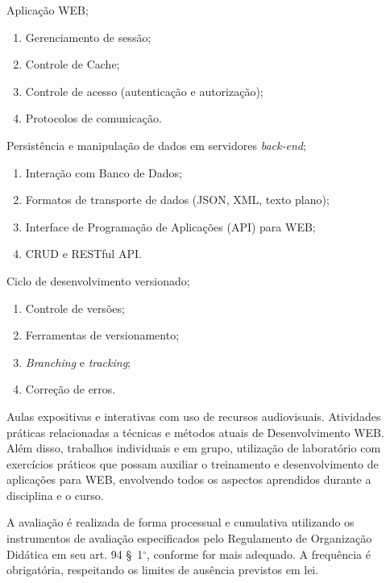 \begin{pud}
\begin{description}[itemsep=0em]
        \item[UNIDADE II:] Aplicação WEB;
	         \begin{enumerate}[itemsep=0em, topsep=0em]
				\item Gerenciamento de sessão;
				\item Controle de Cache;
				\item Controle de acesso (autenticação e autorização);
				\item Protocolos de comunicação.
            \end{enumerate}
            
         \item[UNIDADE III:] Persistência e manipulação de dados em servidores \textit{back-end};
	         \begin{enumerate}[itemsep=0em, topsep=0em]
				\item Interação com Banco de Dados;
				\item Formatos de transporte de dados (JSON, XML, texto plano);
				\item Interface de Programação de Aplicações (API) para WEB;
				\item CRUD e RESTful API.        
            \end{enumerate}
            
         \item[UNIDADE IV:]  Ciclo de desenvolvimento versionado;
	         \begin{enumerate}[itemsep=0em, topsep=0em]
				\item Controle de versões;
                \item Ferramentas de versionamento;
                \item \textit{Branching} e \textit{tracking};
                \item Correção de erros.
            \end{enumerate}

	\end{description}
	
	
	\metodologia
	Aulas expositivas e interativas com uso de recursos audiovisuais. Atividades práticas relacionadas a técnicas e métodos atuais de Desenvolvimento WEB. Além disso, trabalhos individuais e em grupo, utilização de laboratório com exercícios práticos que possam auxiliar o treinamento e desenvolvimento de aplicações para WEB, envolvendo todos os aspectos aprendidos durante a disciplina e o curso.
	
	\avaliacao
	A avaliação é realizada de forma processual e cumulativa utilizando os instrumentos de avaliação especificados pelo Regulamento de Organização Didática em seu art. 94 \S~1$^\circ$, conforme for mais adequado. A frequência é obrigatória, respeitando os limites de ausência previstos em lei.
	

\end{pud}
